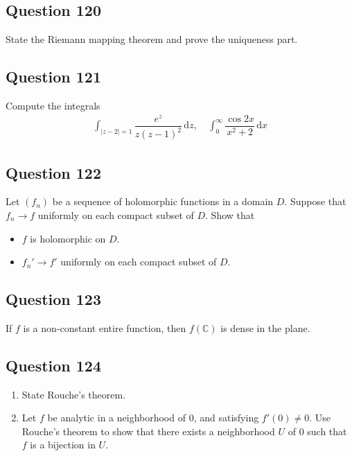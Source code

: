 \documentclass[12pt]{article}
\begin{document}
\hypertarget{question-120-1}{%
\subsection{Question 120}\label{question-120-1}}

State the Riemann mapping theorem and prove the uniqueness part.

\hypertarget{question-121-1}{%
\subsection{Question 121}\label{question-121-1}}

Compute the integrals \begin{align*}
\int_{|z-2|=1} \dfrac{e^z}{z(z-1)^2} \,
\mathrm{d}z, \quad \int_0^\infty \dfrac{\cos 2x}{x^2 + 2} \, \mathrm{d}x
\end{align*}

\hypertarget{question-122-1}{%
\subsection{Question 122}\label{question-122-1}}

Let \((f_n)\) be a sequence of holomorphic functions in a domain \(D\).
Suppose that \(f_n \to f\) uniformly on each compact subset of \(D\).
Show that

\begin{itemize}
\item
  \(f\) is holomorphic on \(D\).
\item
  \(f_n' \to f'\) uniformly on each compact subset of \(D\).
\end{itemize}

\hypertarget{question-123-1}{%
\subsection{Question 123}\label{question-123-1}}

If \(f\) is a non-constant entire function, then \(f(\mathbb{C})\) is
dense in the plane.

\hypertarget{question-124-1}{%
\subsection{Question 124}\label{question-124-1}}

\begin{enumerate}
\def\labelenumi{\arabic{enumi}.}
\item
  State Rouche's theorem.
\item
  Let \(f\) be analytic in a neighborhood of \(0\), and satisfying
  \(f'(0) \neq 0\). Use Rouche's theorem to show that there exists a
  neighborhood \(U\) of \(0\) such that \(f\) is a bijection in \(U\).
\end{enumerate}
\end{document}

